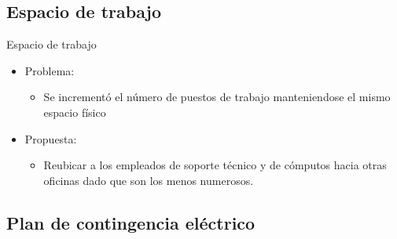 \documentclass[spanish]{beamer}
\begin{document}
\subsection{Espacio de trabajo}

\begin{frame}{Espacio de trabajo}
  \begin{itemize}
    \item Problema:
      \begin{itemize}
      \item Se incrementó el número de puestos de trabajo
        manteniendose el mismo espacio físico
      \end{itemize}
    \item Propuesta:
      \begin{itemize}
        \item Reubicar a los empleados de soporte técnico y de cómputos
          hacia otras oficinas dado que son los menos numerosos.
      \end{itemize}
    \end{itemize}
\end{frame}


\subsection{Plan de contingencia eléctrico}
\end{document}
